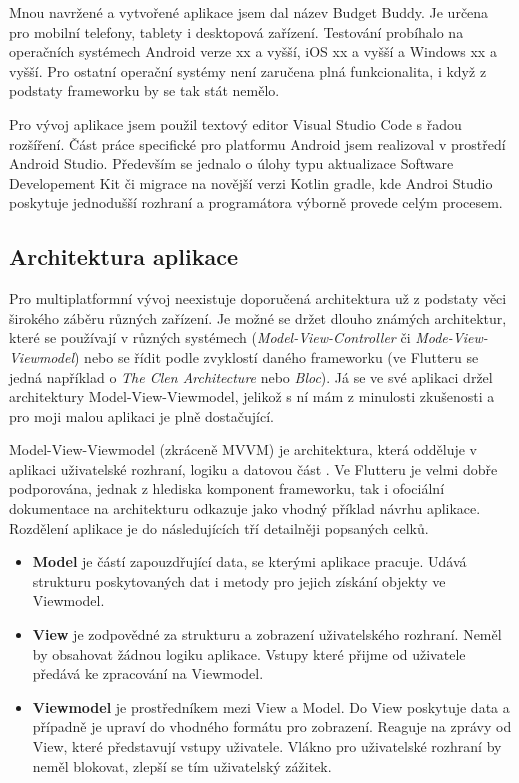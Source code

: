 \documentclass[
  biblatex,
  figures=true,
  tables=false,
  glossaries,
  index
]{kidiplom}
\begin{document}
Mnou navržené a vytvořené aplikace jsem dal název Budget Buddy. Je určena pro mobilní telefony, tablety i desktopová zařízení. Testování probíhalo na operačních systémech Android verze xx a vyšší, iOS xx a vyšší a Windows xx a vyšší. Pro ostatní operační systémy není zaručena plná funkcionalita, i když z podstaty frameworku by se tak stát nemělo.

Pro vývoj aplikace jsem použil textový editor Visual Studio Code s řadou rozšíření. Část práce specifické pro platformu Android jsem realizoval v prostředí Android Studio. Především se jednalo o úlohy typu aktualizace Software Developement Kit či migrace na novější verzi Kotlin gradle, kde Androi Studio poskytuje jednodušší rozhraní a programátora výborně provede celým procesem.

\subsection{Architektura aplikace}
Pro multiplatformní vývoj neexistuje doporučená architektura už z podstaty věci širokého záběru různých zařízení. Je možné se držet dlouho známých architektur, které se používají v různých systémech (\textit{Model-View-Controller} či \textit{Mode-View-Viewmodel}) nebo se řídit podle zvyklostí daného frameworku (ve Flutteru se jedná například o \textit{The Clen Architecture} nebo \textit{Bloc}). Já se ve své aplikaci držel architektury Model-View-Viewmodel, jelikož s ní mám z minulosti zkušenosti a pro moji malou aplikaci je plně dostačující. 

Model-View-Viewmodel (zkráceně MVVM) je architektura, která odděluje v aplikaci uživatelské rozhraní, logiku a datovou část \cite{mvvm}. Ve Flutteru je velmi dobře podporována, jednak z hlediska komponent frameworku, tak i ofociální dokumentace na architekturu odkazuje jako vhodný příklad návrhu aplikace. Rozdělení aplikace je do následujících tří detailněji popsaných celků.
\begin{itemize}
  \item \textbf{Model} je částí zapouzdřující data, se kterými aplikace pracuje. Udává strukturu poskytovaných dat i metody pro jejich získání objekty ve Viewmodel.
  \item \textbf{View} je zodpovědné za strukturu a zobrazení uživatelského rozhraní. Neměl by obsahovat žádnou logiku aplikace. Vstupy které přijme od uživatele předává ke zpracování na Viewmodel. 
  \item \textbf{Viewmodel} je prostředníkem mezi View a Model. Do View poskytuje data a případně je upraví do vhodného formátu pro zobrazení. Reaguje na zprávy od View, které představují vstupy uživatele. Vlákno pro uživatelské rozhraní by neměl blokovat, zlepší se tím uživatelský zážitek.
\end{itemize}
\end{document}
